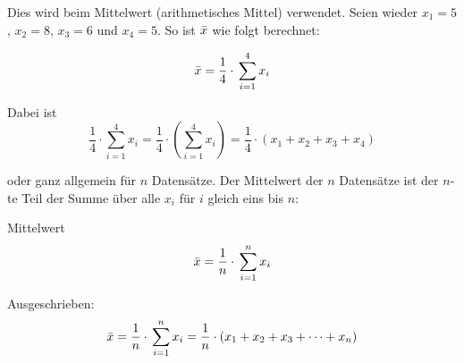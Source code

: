 Dies wird \zB beim Mittelwert (arithmetisches Mittel)
verwendet. Seien wieder $x_1=5$, $x_2=8$, $x_3=6$ und $x_4=5$. So ist
$\bar{x}$ wie folgt berechnet:

$$\bar{x} = \frac{1}{4}\cdot{}\sum_{i=1}^{4}{x_i}$$

Dabei ist $$\frac{1}{4}\cdot{}\sum_{i=1}^{4}{x_i}=\frac{1}{4}\cdot{}\left( \sum_{i=1}^{4}{x_i}\right) =\frac{1}{4}\cdot{}(x_1 + x_2 + x_3 + x_4)$$

oder ganz allgemein für $n$ Datensätze. Der Mittelwert der $n$
Datensätze ist der $n$-te Teil der Summe über alle $x_i$ für $i$
gleich eins bis $n$:

\begin{gesetz}{Mittelwert}{}
$$\bar{x} = \frac{1}{n}\cdot{}\sum_{i=1}^{n}{x_i}$$
\end{gesetz}

Ausgeschrieben:
$$\bar{x} = \frac{1}{n}\cdot{}\sum_{i=1}^{n}{x_i} = \frac{1}{n}\cdot{}(x_1 + x_2 + x_3 + \dots + x_n)$$

\newpage
